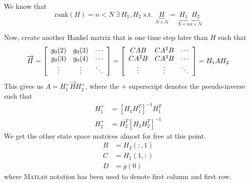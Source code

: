 \documentclass[lecture,12pt,]{pcms-l}
\theoremstyle{example}
\begin{document}
We know that
$$\text{rank}(H)=n<N ~\exists~ H_1, H_2 \text{ s.t. } \underbrace{H}_{N\times N} = \underbrace{H_1}_{N\times n} \underbrace{H_2}_{n\times N}$$

Now, create another Hankel matrix that is one time step later than $H$ such that
\begin{align*}
\overrightarrow{H} = \left[\begin{array}{c c c} g_0(2) & g_0(3) & \cdots \\ g_0(3) & g_0(4) & \cdots \\ \vdots & \vdots & \ddots \end{array}\right]
= \left[\begin{array}{c c c} CAB & CA^2B & \cdots \\ CA^2B & CA^3B & \cdots \\ \vdots & \vdots & \ddots \end{array}\right] = H_1AH_2
\end{align*}
This gives us $A=H_1^+\overrightarrow{H}H_2^+$, where the $+$ superscript denotes the pseudo-inverse such that
\begin{align*}
H_1^+ &= [H_1H_1^T]^{-1}H_1^T \\
H_2^+ &= H_2^T[H_2H_2^T]^{-1}
\end{align*}
We get the other state space matrices almost for free at this point.
\begin{align*}
B &= H_2(:,1) \\
C &= H_1(1,:) \\
D &= g(0)
\end{align*}
where \textsc{Matlab} notation has been used to denote first column and first row.
\end{document}
